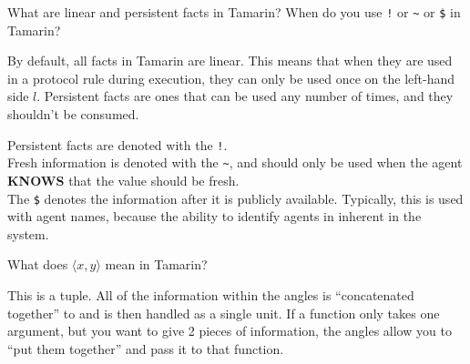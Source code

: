 \begin{questions}
\question{} What are linear and persistent facts in Tamarin? When do you use \texttt{!} or \texttt{\textasciitilde{}} or \texttt{\$} in Tamarin?
  \begin{solution}
    By default, all facts in Tamarin are linear. This means that when they are used in a protocol rule during execution, they can only be used once on the left-hand side $l$.
    Persistent facts are ones that can be used any number of times, and they shouldn't be consumed.

    Persistent facts are denoted with the \texttt{!}. \\
    Fresh information is denoted with the \texttt{\textasciitilde{}}, and should only be used when the agent \textbf{KNOWS} that the value should be fresh. \\
    The \texttt{\$} denotes the information after it is publicly available.
    Typically, this is used with agent names, because the ability to identify agents in inherent in the system.
  \end{solution}

\question{} What does $\langle x, y \rangle$ mean in Tamarin?
  \begin{solution}
    This is a tuple.
    All of the information within the angles is ``concatenated together'' to and is then handled as a single unit.
    If a function only takes one argument, but you want to give 2 pieces of information, the angles allow you to ``put them together'' and pass it to that function.
  \end{solution}
\end{questions}

